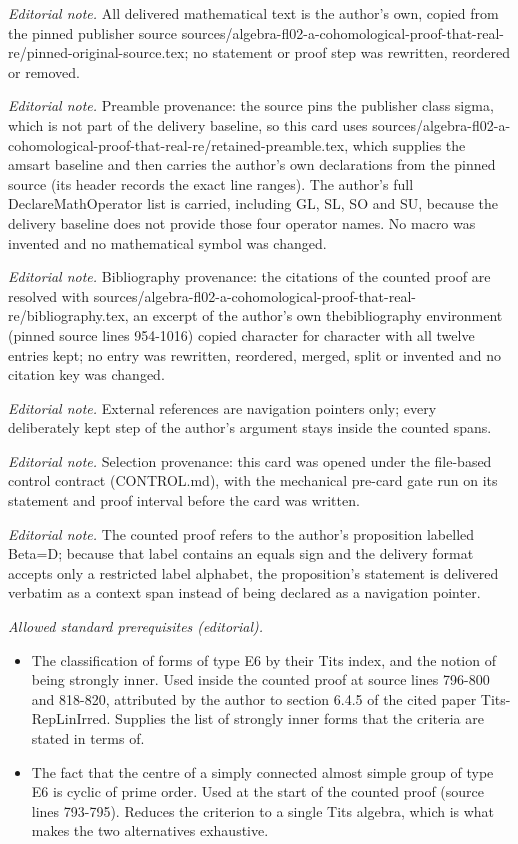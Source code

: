 \maketitle
\noindent\textit{Editorial note.} All delivered mathematical text is the author's own, copied from the pinned publisher source sources/algebra-fl02-a-cohomological-proof-that-real-re/pinned-original-source.tex; no statement or proof step was rewritten, reordered or removed.\par\medskip
\noindent\textit{Editorial note.} Preamble provenance: the source pins the publisher class sigma, which is not part of the delivery baseline, so this card uses sources/algebra-fl02-a-cohomological-proof-that-real-re/retained-preamble.tex, which supplies the amsart baseline and then carries the author's own declarations from the pinned source (its header records the exact line ranges). The author's full DeclareMathOperator list is carried, including GL, SL, SO and SU, because the delivery baseline does not provide those four operator names. No macro was invented and no mathematical symbol was changed.\par\medskip
\noindent\textit{Editorial note.} Bibliography provenance: the citations of the counted proof are resolved with sources/algebra-fl02-a-cohomological-proof-that-real-re/bibliography.tex, an excerpt of the author's own thebibliography environment (pinned source lines 954-1016) copied character for character with all twelve entries kept; no entry was rewritten, reordered, merged, split or invented and no citation key was changed.\par\medskip
\noindent\textit{Editorial note.} External references are navigation pointers only; every deliberately kept step of the author's argument stays inside the counted spans.\par\medskip
\noindent\textit{Editorial note.} Selection provenance: this card was opened under the file-based control contract (CONTROL.md), with the mechanical pre-card gate run on its statement and proof interval before the card was written.\par\medskip
\noindent\textit{Editorial note.} The counted proof refers to the author's proposition labelled Beta=D; because that label contains an equals sign and the delivery format accepts only a restricted label alphabet, the proposition's statement is delivered verbatim as a context span instead of being declared as a navigation pointer.\par\medskip
\noindent\textit{Allowed standard prerequisites (editorial).}\begin{itemize}
\item The classification of forms of type E6 by their Tits index, and the notion of being strongly inner. Used inside the counted proof at source lines 796-800 and 818-820, attributed by the author to section 6.4.5 of the cited paper Tits-RepLinIrred. Supplies the list of strongly inner forms that the criteria are stated in terms of.
\item The fact that the centre of a simply connected almost simple group of type E6 is cyclic of prime order. Used at the start of the counted proof (source lines 793-795). Reduces the criterion to a single Tits algebra, which is what makes the two alternatives exhaustive.
\end{itemize}\medskip
